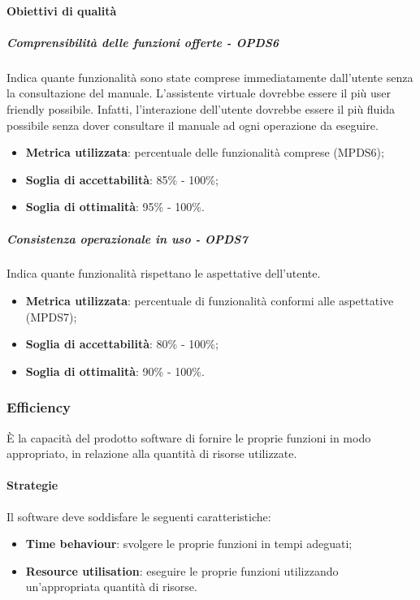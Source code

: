 \documentclass[PdQ.tex]{subfiles}
\begin{document}
			\paragraph{Obiettivi di qualità}

				\subparagraph{Comprensibilità delle funzioni offerte - OPDS6}
				Indica quante funzionalità sono state comprese immediatamente dall'utente senza la consultazione del manuale. L'assistente virtuale dovrebbe essere
				il più user friendly possibile. Infatti, l'interazione dell'utente dovrebbe essere il più fluida possibile senza dover consultare il manuale
				ad ogni operazione da eseguire.
				\begin{itemize}
					\item \textbf{Metrica utilizzata}: percentuale delle funzionalità comprese (MPDS6);
					\item \textbf{Soglia di accettabilità}: 85\% - 100\%;
					\item \textbf{Soglia di ottimalità}: 95\% - 100\%.
				\end{itemize}

				\subparagraph{Consistenza operazionale in uso - OPDS7}
				Indica quante funzionalità rispettano le aspettative dell'utente.
				\begin{itemize}
					\item \textbf{Metrica utilizzata}: percentuale di funzionalità conformi alle aspettative (MPDS7);
					\item \textbf{Soglia di accettabilità}: 80\% - 100\%;
					\item \textbf{Soglia di ottimalità}: 90\% - 100\%.
				\end{itemize}

		\subsubsection{Efficiency}
		È la capacità del prodotto software di fornire le proprie funzioni in modo appropriato, in relazione alla quantità di risorse utilizzate.

			\paragraph{Strategie}
			Il software deve soddisfare le seguenti caratteristiche:
			\begin{itemize}
				\item \textbf{Time behaviour}: svolgere le proprie funzioni in tempi adeguati;
				\item \textbf{Resource utilisation}: eseguire le proprie funzioni utilizzando un'appropriata quantità di risorse.
			\end{itemize}
\end{document}
